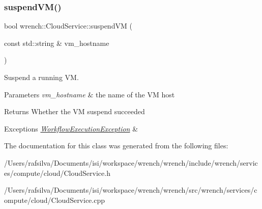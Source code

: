 \subsubsection{\texorpdfstring{suspend\+V\+M()}{suspendVM()}}
{\footnotesize\ttfamily bool wrench\+::\+Cloud\+Service\+::suspend\+VM (\begin{DoxyParamCaption}\item[{const std\+::string \&}]{vm\+\_\+hostname }\end{DoxyParamCaption})\hspace{0.3cm}{\ttfamily [virtual]}}



Suspend a running VM. 


\begin{DoxyParams}{Parameters}
{\em vm\+\_\+hostname} & the name of the VM host\\
\hline
\end{DoxyParams}
\begin{DoxyReturn}{Returns}
Whether the VM suspend succeeded
\end{DoxyReturn}

\begin{DoxyExceptions}{Exceptions}
{\em \hyperlink{classwrench_1_1_workflow_execution_exception}{Workflow\+Execution\+Exception}} & \\
\hline
\end{DoxyExceptions}


The documentation for this class was generated from the following files\+:\begin{DoxyCompactItemize}
\item 
/\+Users/rafsilva/\+Documents/isi/workspace/wrench/wrench/include/wrench/services/compute/cloud/Cloud\+Service.\+h\item 
/\+Users/rafsilva/\+Documents/isi/workspace/wrench/wrench/src/wrench/services/compute/cloud/Cloud\+Service.\+cpp\end{DoxyCompactItemize}
